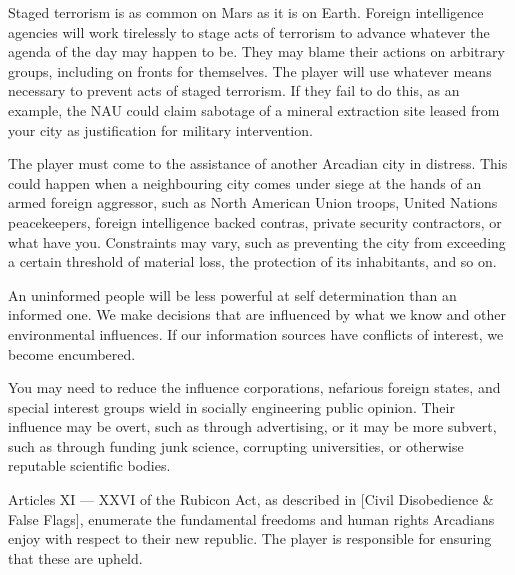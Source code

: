 
Staged terrorism is as common on Mars as it is on Earth. Foreign intelligence agencies will work tirelessly to stage acts of terrorism to advance whatever the agenda of the day may happen to be. They may blame their actions on arbitrary groups, including on fronts for themselves. The player will use whatever means necessary to prevent acts of staged terrorism. If they fail to do this, as an example, the NAU could claim sabotage of a mineral extraction site leased from your city as justification for military intervention.


The player must come to the assistance of another Arcadian city in distress. This could happen when a neighbouring city comes under siege at the hands of an armed foreign aggressor, such as North American Union troops, United Nations peacekeepers, foreign intelligence backed contras, private security contractors, or what have you. Constraints may vary, such as preventing the city from exceeding a certain threshold of material loss, the protection of its inhabitants, and so on.


An uninformed people will be less powerful at self determination than an informed one. We make decisions that are influenced by what we know and other environmental influences. If our information sources have conflicts of interest, we become encumbered.

You may need to reduce the influence corporations, nefarious foreign states, and special interest groups wield in socially engineering public opinion. Their influence may be overt, such as through advertising, or it may be more subvert, such as through funding junk science, corrupting universities, or otherwise reputable scientific bodies.


Articles XI --- XXVI of the Rubicon Act, as described in [Civil Disobedience & False Flags], enumerate the fundamental freedoms and human rights Arcadians enjoy with respect to their new republic. The player is responsible for ensuring that these are upheld.


